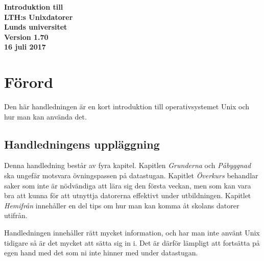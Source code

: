 \documentclass[a4paper,twocolumn]{book}
\begin{document}
\frontmatter

\begin{titlepage}
  \vspace*{30mm}
  \begin{center}
    \sffamily
    \renewcommand{\baselinestretch}{1.1}
    \Huge\bfseries Introduktion till \\[2mm]
      LTH:s Unixdatorer \\[7mm]
    \large Lunds universitet \\[5mm]
    Version 1.70 \\
    16 juli 2017
  \end{center}
\end{titlepage}

\onecolumn
\thispagestyle{empty}
\hbox{}\vfill\noindent
\twocolumn

{\parskip 0pt%
  \tableofcontents}             %

\chapter{Förord}
\label{cha:forord}

Den här handledningen är en kort introduktion till operativsystemet Unix och 
hur man kan använda det.

\section*{Handledningens uppläggning}

Denna handledning består av fyra kapitel. Kapitlen \emph{Grunderna} och \emph{Påbyggnad} ska ungefär
motsvara övningspassen på datastugan. Kapitlet \emph{Överkurs}
behandlar saker som inte är nödvändiga att lära sig den första veckan,
men som kan vara bra att kunna för att utnyttja datorerna effektivt under
utbildningen. Kapitlet \emph{Hemifrån} innehåller en del tips om hur man kan
komma åt skolans datorer utifrån.

Handledningen innehåller rätt mycket information, och har man inte använt Unix
 tidigare så är det mycket att sätta sig in i.
Det är därför lämpligt att fortsätta på egen hand med det som ni
inte hinner med under datastugan.
\end{document}
